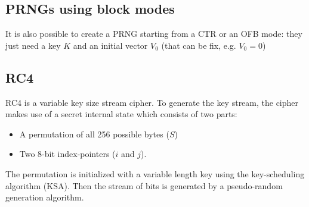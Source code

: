 \subsection{PRNGs using block modes}
\begin{figure}
\vspace{-65pt}
\end{figure}
It is also possible to create a PRNG starting from a CTR or an OFB mode: they just need a key $K$ and an initial vector $V_0$ (that can be fix, e.g. $V_0=0$)

\subsection{RC4}
RC4 is a variable key size stream cipher. To generate the key stream, the cipher makes use of a secret internal state which consists of two parts:
\begin{itemize}
    \item A permutation of all 256 possible bytes ($S$)
    \item Two 8-bit index-pointers ($i$ and $j$).
\end{itemize}
The permutation is initialized with a variable length key using the key-scheduling algorithm (KSA). Then the stream of bits is generated by a pseudo-random generation algorithm.
\begin{center}
\end{center}
